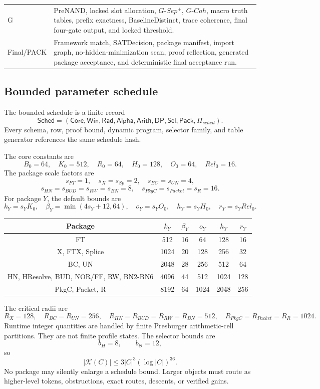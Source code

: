 \documentclass[10.5pt,a4paper]{article}
\begin{document}
\begin{longtable}{>{\raggedright\arraybackslash}p{}p{}}
G & PreNAND, locked slot allocation, \(G\text{-}Sep^+\), \(G\text{-}Coh\), macro truth tables, prefix exactness, BaselineDistinct, trace coherence, final four-gate output, and locked threshold.\\
Final/PACK & Framework match, SATDecision, package manifest, import graph, no-hidden-minimization scan, proof reflection, generated package acceptance, and deterministic final acceptance run.\\
\bottomrule
\end{longtable}

\subsection{Bounded parameter schedule}
The bounded schedule is a finite record
\[
\mathsf{Sched}=(\mathsf{Core},\mathsf{Win},\mathsf{Rad},\mathsf{Alpha},\mathsf{Arith},\mathsf{DP},\mathsf{Sel},\mathsf{Pack},\Pi_{sched}).
\]
Every schema, row, proof bound, dynamic program, selector family, and table generator references the same schedule hash.

The core constants are
\[
B_0=64,\quad K_0=512,\quad R_0=64,\quad H_0=128,\quad O_0=64,\quad Rel_0=16.
\]
The package scale factors are
\[
s_{FT}=1,
\quad s_X=s_{Sp}=2,
\quad s_{BC}=s_{UN}=4,
\]
\[
s_{HN}=s_{BUD}=s_{RW}=s_{BN}=8,
\quad s_{PkgC}=s_{Packet}=s_R=16.
\]
For package \(Y\), the default bounds are
\[
k_Y=s_YK_0,
\quad \beta_Y=\min(4s_Y+12,64),
\quad o_Y=s_YO_0,
\quad h_Y=s_YH_0,
\quad r_Y=s_YRel_0.
\]

\begin{longtable}{c|ccccc}
\toprule
Package & \(k_Y\) & \(\beta_Y\) & \(o_Y\) & \(h_Y\) & \(r_Y\)\\
\midrule
FT & 512 & 16 & 64 & 128 & 16\\
X, FTX, Splice & 1024 & 20 & 128 & 256 & 32\\
BC, UN & 2048 & 28 & 256 & 512 & 64\\
HN, HResolve, BUD, NOR/FF, RW, BN2-BN6 & 4096 & 44 & 512 & 1024 & 128\\
PkgC, Packet, R & 8192 & 64 & 1024 & 2048 & 256\\
\bottomrule
\end{longtable}

The critical radii are
\[
R_X=128,
\quad R_{BC}=R_{UN}=256,
\quad R_{HN}=R_{BUD}=R_{RW}=R_{BN}=512,
\quad R_{PkgC}=R_{Packet}=R_R=1024.
\]
Runtime integer quantities are handled by finite Presburger arithmetic-cell partitions.  They are not finite profile states.  The selector bounds are
\[
b_H=8,
\qquad b_\Theta=12,
\]
so
\[
|\mathcal K(C)|\le 3|C|^3(\log |C|)^{36}.
\]
No package may silently enlarge a schedule bound.  Larger objects must route as higher-level tokens, obstructions, exact routes, descents, or verified gains.
\end{document}
